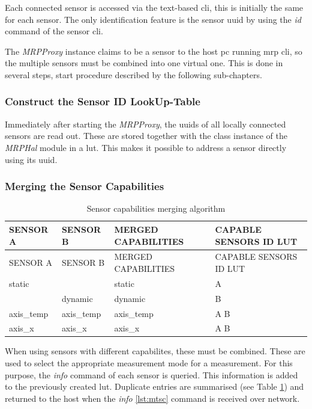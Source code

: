 Each connected sensor is accessed via the text-based \gls{cli}, this is
initially the same for each sensor. The only identification feature is
the sensor \gls{uuid} by using the \emph{id} command of the sensor
\gls{cli}.

The \emph{MRPProxy} instance claims to be a sensor to the host \gls{pc}
running \gls{mrp} \gls{cli}, so the multiple sensors must be combined
into one virtual one. This is done in several steps, start procedure
described by the following sub-chapters.

\hypertarget{construct-the-sensor-id-lookup-table}{%
\subsubsection{Construct the Sensor ID
LookUp-Table}\label{construct-the-sensor-id-lookup-table}}

Immediately after starting the \emph{MRPProxy}, the \gls{uuid}s of all
locally connected sensors are read out. These are stored together with
the class instance of the \emph{MRPHal} module in a \gls{lut}. This
makes it possible to address a sensor directly using its \gls{uuid}.

\hypertarget{merging-the-sensor-capabilities}{%
\subsubsection{Merging the Sensor
Capabilities}\label{merging-the-sensor-capabilities}}

\begin{longtable}[]{@{}llll@{}}
\caption{Sensor capabilities merging algorithm
\label{Sensor_capabilities_merging_algorithm.csv}}\tabularnewline
\toprule
SENSOR A & SENSOR B & MERGED CAPABILITIES & CAPABLE SENSORS ID
LUT\tabularnewline
\midrule
\endfirsthead
\toprule
SENSOR A & SENSOR B & MERGED CAPABILITIES & CAPABLE SENSORS ID
LUT\tabularnewline
\midrule
\endhead
static & & static & A\tabularnewline
& dynamic & dynamic & B\tabularnewline
axis\_temp & axis\_temp & axis\_temp & A B\tabularnewline
axis\_x & axis\_x & axis\_x & A B\tabularnewline
\bottomrule
\end{longtable}

When using sensors with different capabilites, these must be combined.
These are used to select the appropriate measurement mode for a
measurement. For this purpose, the \emph{info} command of each sensor is
queried. This information is added to the previously created \gls{lut}.
Duplicate entries are summarised (see Table
\ref{Sensor_capabilities_merging_algorithm.csv}) and returned to the
host when the \emph{info} \ref{lst:mtsc} command is received over
network.

